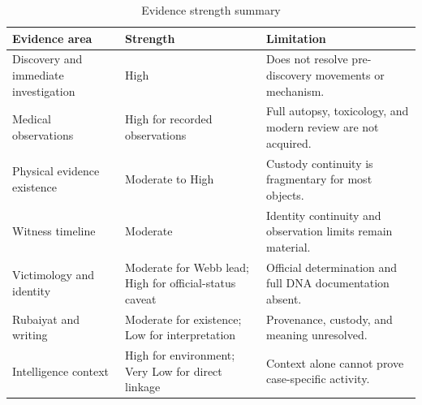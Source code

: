 \begin{table}[htbp]
\centering
\caption{Evidence strength summary}
\label{tab:chapter12-evidence-strength}
\scriptsize
\setlength{\tabcolsep}{2pt}
\renewcommand{\arraystretch}{1.12}
\begin{tabularx}{\textwidth}{>{\raggedright\arraybackslash}p{}>{\raggedright\arraybackslash}p{}>{\raggedright\arraybackslash}X}
\toprule
Evidence area & Strength & Limitation \\
\midrule
Discovery and immediate investigation & High & Does not resolve pre-discovery movements or mechanism. \\
Medical observations & High for recorded observations & Full autopsy, toxicology, and modern review are not acquired. \\
Physical evidence existence & Moderate to High & Custody continuity is fragmentary for most objects. \\
Witness timeline & Moderate & Identity continuity and observation limits remain material. \\
Victimology and identity & Moderate for Webb lead; High for official-status caveat & Official determination and full DNA documentation absent. \\
Rubaiyat and writing & Moderate for existence; Low for interpretation & Provenance, custody, and meaning unresolved. \\
Intelligence context & High for environment; Very Low for direct linkage & Context alone cannot prove case-specific activity. \\
\bottomrule
\end{tabularx}
\end{table}


